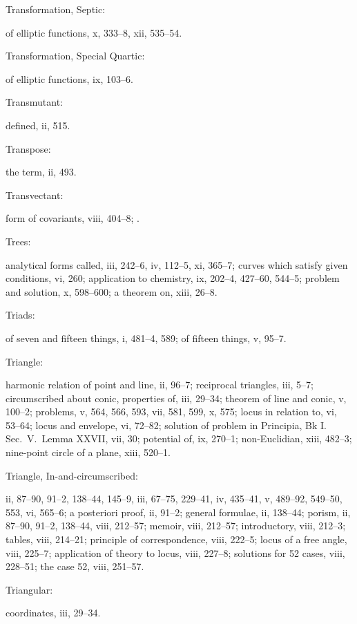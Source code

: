 \documentclass[11pt,a4paper]{book}
\providecommand{\V}[1]{#1}
\providecommand{\IndexEntry}[2]{#1\dotfill #2\par}
\begin{document}
\IndexEntry{Transformation, Septic}: of elliptic functions, \V{x}, 333--8, \V{xii}, 535--54.

\IndexEntry{Transformation, Special Quartic}: of elliptic functions, \V{ix}, 103--6.

\newpage

\setcounter{page}{129}

\IndexEntry{Transmutant}: defined, \V{ii}, 515.

\IndexEntry{Transpose}: the term, \V{ii}, 493.

\IndexEntry{Transvectant}: form of covariants, \V{viii}, 404--8; .

\IndexEntry{Trees}: analytical forms called, \V{iii}, 242--6, \V{iv}, 112--5, \V{xi}, 365--7; curves which satisfy given conditions, \V{vi}, 260; application to chemistry, \V{ix}, 202--4, 427--60, 544--5; problem and solution, \V{x}, 598--600; a theorem on, \V{xiii}, 26--8.

\IndexEntry{Triads}: of seven and fifteen things, \V{i}, 481--4, 589; of fifteen things, \V{v}, 95--7.

\IndexEntry{Triangle}: harmonic relation of point and line, \V{ii}, 96--7; reciprocal triangles, \V{iii}, 5--7; circumscribed about conic, properties of, \V{iii}, 29--34; theorem of line and conic, \V{v}, 100--2; problems, \V{v}, 564, 566, 593, \V{vii}, 581, 599, \V{x}, 575; locus in relation to, \V{vi}, 53--64; locus and envelope, \V{vi}, 72--82; solution of problem in Principia, Bk I. Sec.\ V.\ Lemma XXVII, \V{vii}, 30; potential of, \V{ix}, 270--1; non-Euclidian, \V{xiii}, 482--3; nine-point circle of a plane, \V{xiii}, 520--1.

\IndexEntry{Triangle, In-and-circumscribed}: \V{ii}, 87--90, 91--2, 138--44, 145--9, \V{iii}, 67--75, 229--41, \V{iv}, 435--41, \V{v}, 489--92, 549--50, 553, \V{vi}, 565--6; a posteriori proof, \V{ii}, 91--2; general formulae, \V{ii}, 138--44; porism, \V{ii}, 87--90, 91--2, 138--44, \V{viii}, 212--57; memoir, \V{viii}, 212--57; introductory, \V{viii}, 212--3; tables, \V{viii}, 214--21; principle of correspondence, \V{viii}, 222--5; locus of a free angle, \V{viii}, 225--7; application of theory to locus, \V{viii}, 227--8; solutions for 52 cases, \V{viii}, 228--51; the case 52, \V{viii}, 251--57.

\IndexEntry{Triangular}: coordinates, \V{iii}, 29--34.
\end{document}
